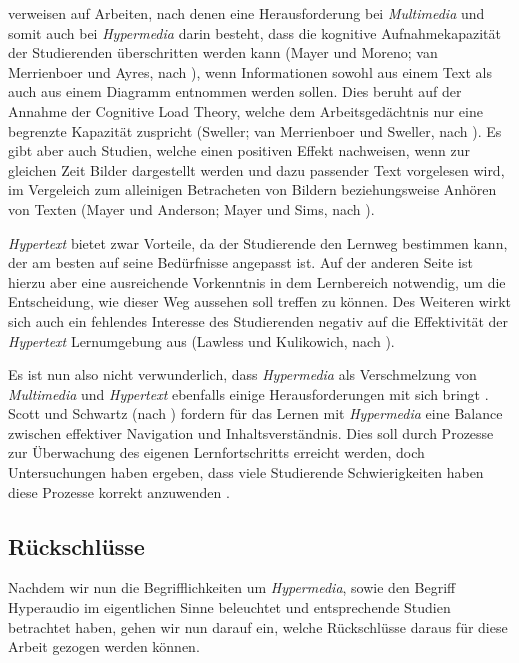 \cite{moos2010multimedia} verweisen auf Arbeiten, nach denen eine Herausforderung bei \textit{Multimedia} und somit auch bei \textit{Hypermedia} darin besteht, dass die kognitive Aufnahmekapazität der Studierenden überschritten werden kann (Mayer und Moreno; van Merrienboer und Ayres, nach \cite{moos2010multimedia}), wenn Informationen sowohl aus einem Text als auch aus einem Diagramm entnommen werden sollen. Dies beruht auf der Annahme der Cognitive Load Theory, welche dem Arbeitsgedächtnis nur eine begrenzte Kapazität zuspricht (Sweller; van Merrienboer und Sweller, nach \cite{moos2010multimedia}). Es gibt aber auch Studien, welche einen positiven Effekt nachweisen, wenn zur gleichen Zeit Bilder dargestellt werden und dazu passender Text vorgelesen wird, im Vergeleich zum alleinigen Betracheten von Bildern beziehungsweise Anhören von Texten (Mayer und Anderson; Mayer und Sims, nach \cite{moos2010multimedia}).

\textit{Hypertext} bietet zwar Vorteile, da der Studierende den Lernweg bestimmen kann, der am besten auf seine Bedürfnisse angepasst ist. Auf der anderen Seite ist hierzu aber eine ausreichende Vorkenntnis in dem Lernbereich notwendig, um die Entscheidung, wie dieser Weg aussehen soll treffen zu können. Des Weiteren wirkt sich auch ein fehlendes Interesse des Studierenden negativ auf die Effektivität der \textit{Hypertext} Lernumgebung aus (Lawless und Kulikowich, nach \cite{moos2010multimedia}).

Es ist nun also nicht verwunderlich, dass \textit{Hypermedia} als Verschmelzung von \textit{Multimedia} und \textit{Hypertext} ebenfalls einige Herausforderungen mit sich bringt \citep{moos2010multimedia}. Scott und Schwartz (nach \cite{moos2010multimedia}) fordern für das Lernen mit \textit{Hypermedia} eine Balance zwischen effektiver Navigation und Inhaltsverständnis. Dies soll durch Prozesse zur Überwachung des eigenen Lernfortschritts erreicht werden, doch Untersuchungen haben ergeben, dass viele Studierende Schwierigkeiten haben diese Prozesse korrekt anzuwenden \citep{moos2010multimedia}.


\subsection{Rückschlüsse}
Nachdem wir nun die Begrifflichkeiten um \textit{Hypermedia}, sowie den Begriff Hyperaudio im eigentlichen Sinne beleuchtet und entsprechende Studien betrachtet haben, gehen wir nun darauf ein, welche Rückschlüsse daraus für diese Arbeit gezogen werden können.

